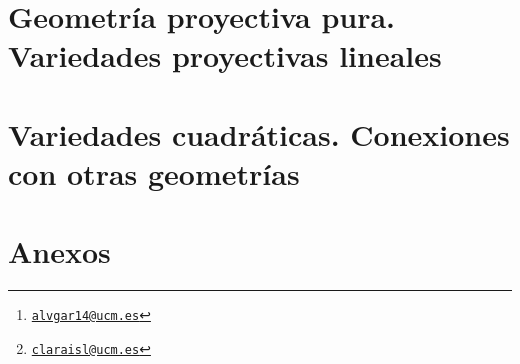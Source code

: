 \documentclass[a4paper, 10pt, twoside, titlepage, openright, onecolumn, final]{book}
\title{\tb{Geometría Lineal}}
\author{Álvaro García Tenorio
	\thanks{\texttt{\url{alvgar14@ucm.es}}}\and
	Clara Isabel López González
	\thanks{\texttt{\url{claraisl@ucm.es}}}}
\date{\today}
\begin{document}
	\maketitle
	\tableofcontents
	
	\part{Geometría proyectiva pura. Variedades proyectivas lineales}
	
	
	
	
	
	
	
	\part{Variedades cuadráticas. Conexiones con otras geometrías}
	
	
	\part{Anexos}
	\appendix
	
	\printindex[general]
	\nocite{*}
\end{document}
